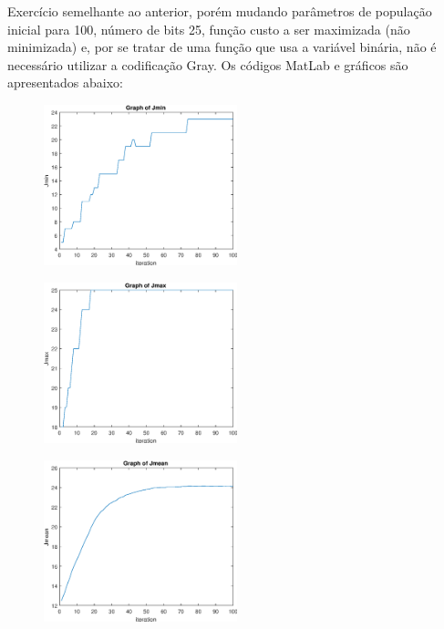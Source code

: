 \documentclass[12pt]{article}
\newenvironment{exercise}[2][Exercício]{\begin{trivlist}
\item[\hskip \labelsep {\bfseries #1}\hskip \labelsep {\bfseries #2.}]}{\end{trivlist}}
\begin{document}
\begin{exercise}{2}
Exercício semelhante ao anterior, porém mudando parâmetros de população inicial
para 100, número de bits 25, função custo a ser maximizada (não minimizada) e,
por se tratar de uma função que usa a variável binária, não é necessário utilizar a codificação
Gray. Os códigos MatLab e gráficos são apresentados abaixo:





 


\begin{figure}[H]
    \centering
    \includegraphics[width=0.5\textwidth]{figs/ex2_jmin.eps}
\end{figure}

\begin{figure}[H]
    \centering
    \includegraphics[width=0.5\textwidth]{figs/ex2_jmax.eps}
\end{figure}

\begin{figure}[H]
    \centering
    \includegraphics[width=0.5\textwidth]{figs/ex2_jmean.eps}
\end{figure}


\end{exercise}
\end{document}
